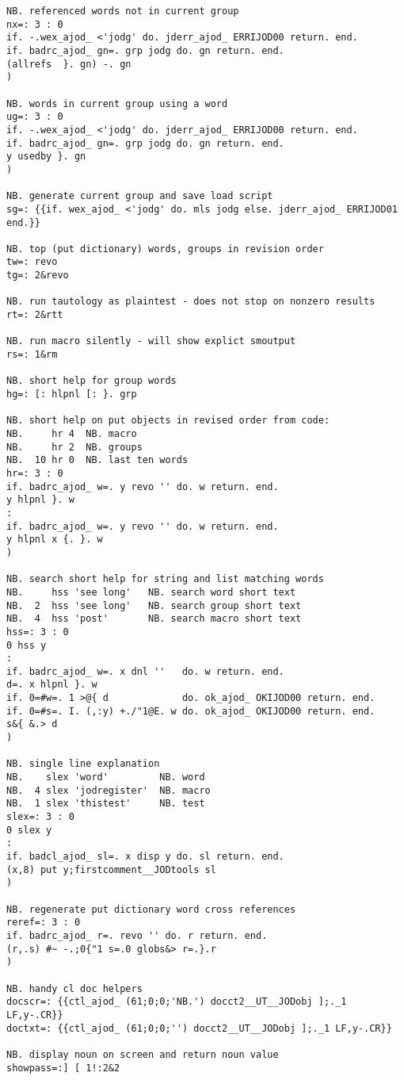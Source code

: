 \begin{lstlisting}[frame=single,framerule=0pt,basicstyle=\ttfamily\footnotesize]
NB. referenced words not in current group
nx=: 3 : 0
if. -.wex_ajod_ <'jodg' do. jderr_ajod_ ERRIJOD00 return. end.
if. badrc_ajod_ gn=. grp jodg do. gn return. end.
(allrefs  }. gn) -. gn
)
   
NB. words in current group using a word
ug=: 3 : 0
if. -.wex_ajod_ <'jodg' do. jderr_ajod_ ERRIJOD00 return. end.
if. badrc_ajod_ gn=. grp jodg do. gn return. end.
y usedby }. gn
)
   
NB. generate current group and save load script
sg=: {{if. wex_ajod_ <'jodg' do. mls jodg else. jderr_ajod_ ERRIJOD01 end.}} 

NB. top (put dictionary) words, groups in revision order
tw=: revo
tg=: 2&revo

NB. run tautology as plaintest - does not stop on nonzero results
rt=: 2&rtt

NB. run macro silently - will show explict smoutput
rs=: 1&rm

NB. short help for group words
hg=: [: hlpnl [: }. grp

NB. short help on put objects in revised order from code:
NB.     hr 4  NB. macro
NB.     hr 2  NB. groups
NB.  10 hr 0  NB. last ten words
hr=: 3 : 0
if. badrc_ajod_ w=. y revo '' do. w return. end.
y hlpnl }. w
:
if. badrc_ajod_ w=. y revo '' do. w return. end.
y hlpnl x {. }. w
)

NB. search short help for string and list matching words
NB.     hss 'see long'   NB. search word short text 
NB.  2  hss 'see long'   NB. search group short text
NB.  4  hss 'post'       NB. search macro short text 
hss=: 3 : 0
0 hss y
:
if. badrc_ajod_ w=. x dnl ''   do. w return. end.
d=. x hlpnl }. w
if. 0=#w=. 1 >@{ d             do. ok_ajod_ OKIJOD00 return. end.
if. 0=#s=. I. (,:y) +./"1@E. w do. ok_ajod_ OKIJOD00 return. end.
s&{ &.> d
)

NB. single line explanation 
NB.    slex 'word'         NB. word
NB.  4 slex 'jodregister'  NB. macro
NB.  1 slex 'thistest'     NB. test
slex=: 3 : 0
0 slex y
:
if. badcl_ajod_ sl=. x disp y do. sl return. end.
(x,8) put y;firstcomment__JODtools sl
)

NB. regenerate put dictionary word cross references
reref=: 3 : 0
if. badrc_ajod_ r=. revo '' do. r return. end.
(r,.s) #~ -.;0{"1 s=.0 globs&> r=.}.r
)

NB. handy cl doc helpers
docscr=: {{ctl_ajod_ (61;0;0;'NB.') docct2__UT__JODobj ];._1 LF,y-.CR}}
doctxt=: {{ctl_ajod_ (61;0;0;'') docct2__UT__JODobj ];._1 LF,y-.CR}}

NB. display noun on screen and return noun value
showpass=:] [ 1!:2&2


\end{lstlisting}
